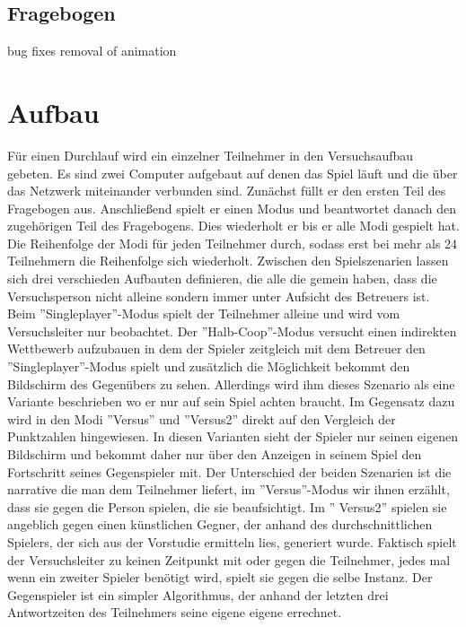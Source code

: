 \subsection{Fragebogen}
bug fixes\newline
removal of animation

\section{Aufbau}
Für einen Durchlauf wird ein einzelner Teilnehmer in den Versuchsaufbau gebeten. Es sind zwei Computer aufgebaut auf denen das Spiel läuft und die über das Netzwerk miteinander verbunden sind. Zunächst füllt er den ersten Teil des Fragebogen aus. Anschließend spielt er einen Modus und beantwortet danach den zugehörigen Teil des Fragebogens. Dies wiederholt er bis er alle Modi gespielt hat. Die Reihenfolge der Modi für jeden Teilnehmer durch, sodass erst bei mehr als 24 Teilnehmern die Reihenfolge sich wiederholt. Zwischen den Spielszenarien lassen sich drei verschieden Aufbauten definieren, die alle die gemein haben, dass die Versuchsperson nicht alleine sondern immer unter Aufsicht des Betreuers ist. Beim ''Singleplayer''-Modus spielt der  Teilnehmer alleine und wird vom Versuchsleiter nur beobachtet. Der ''Halb-Coop''-Modus  versucht einen indirekten Wettbewerb aufzubauen in dem der Spieler zeitgleich mit dem Betreuer den ''Singleplayer''-Modus spielt und zusätzlich die Möglichkeit bekommt den Bildschirm des Gegenübers zu sehen. Allerdings wird ihm dieses Szenario als eine Variante beschrieben wo er nur auf sein Spiel achten braucht. Im Gegensatz dazu wird in den Modi ''Versus'' und ''Versus2'' direkt auf den Vergleich der Punktzahlen hingewiesen. In diesen Varianten sieht der Spieler nur seinen eigenen Bildschirm und bekommt daher nur über den Anzeigen in seinem Spiel den Fortschritt seines Gegenspieler mit. Der Unterschied der beiden Szenarien ist die narrative die man dem Teilnehmer liefert, im ''Versus''-Modus wir ihnen erzählt, dass sie gegen die Person spielen, die sie beaufsichtigt. Im '' Versus2'' spielen sie angeblich gegen einen künstlichen  Gegner, der anhand des durchschnittlichen Spielers, der sich aus der Vorstudie ermitteln lies, generiert wurde. Faktisch spielt der Versuchsleiter zu keinen Zeitpunkt mit oder gegen die Teilnehmer, jedes mal wenn ein zweiter Spieler benötigt wird, spielt sie gegen die selbe Instanz. Der Gegenspieler ist ein simpler Algorithmus, der anhand der letzten drei Antwortzeiten des Teilnehmers seine eigene eigene errechnet.
